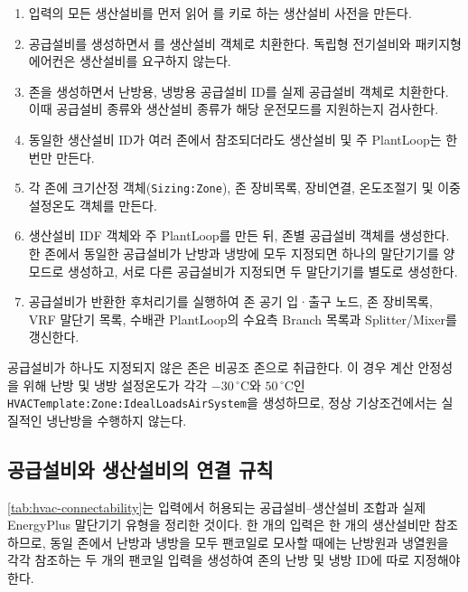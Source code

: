 \begin{enumerate}
  \item 입력의 모든 생산설비를 먼저 읽어 를 키로 하는 생산설비 사전을 만든다.
  \item 공급설비를 생성하면서 를 생산설비 객체로 치환한다. 독립형 전기설비와 패키지형 에어컨은 생산설비를 요구하지 않는다.
  \item 존을 생성하면서 난방용, 냉방용 공급설비 ID를 실제 공급설비 객체로 치환한다. 이때 공급설비 종류와 생산설비 종류가 해당 운전모드를 지원하는지 검사한다.
  \item 동일한 생산설비 ID가 여러 존에서 참조되더라도 생산설비 및 주 PlantLoop는 한 번만 만든다.
  \item 각 존에 크기산정 객체(\texttt{Sizing:Zone}), 존 장비목록, 장비연결, 온도조절기 및 이중 설정온도 객체를 만든다.
  \item 생산설비 IDF 객체와 주 PlantLoop를 만든 뒤, 존별 공급설비 객체를 생성한다. 한 존에서 동일한 공급설비가 난방과 냉방에 모두 지정되면 하나의 말단기기를 양 모드로 생성하고, 서로 다른 공급설비가 지정되면 두 말단기기를 별도로 생성한다.
  \item 공급설비가 반환한 후처리기를 실행하여 존 공기 입·출구 노드, 존 장비목록, VRF 말단기 목록, 수배관 PlantLoop의 수요측 Branch 목록과 Splitter/Mixer를 갱신한다.
\end{enumerate}

공급설비가 하나도 지정되지 않은 존은 비공조 존으로 취급한다. 이 경우 계산 안정성을 위해 난방 및 냉방 설정온도가 각각 $-30\,^{\circ}\mathrm{C}$와 $50\,^{\circ}\mathrm{C}$인 \texttt{HVACTemplate:Zone:IdealLoadsAirSystem}을 생성하므로, 정상 기상조건에서는 실질적인 냉난방을 수행하지 않는다.

\subsection{공급설비와 생산설비의 연결 규칙}

\cref{tab:hvac-connectability}는 입력에서 허용되는 공급설비--생산설비 조합과 실제 EnergyPlus 말단기기 유형을 정리한 것이다. 한 개의  입력은 한 개의 생산설비만 참조하므로, 동일 존에서 난방과 냉방을 모두 팬코일로 모사할 때에는 난방원과 냉열원을 각각 참조하는 두 개의 팬코일 입력을 생성하여 존의 난방 및 냉방 ID에 따로 지정해야 한다.

